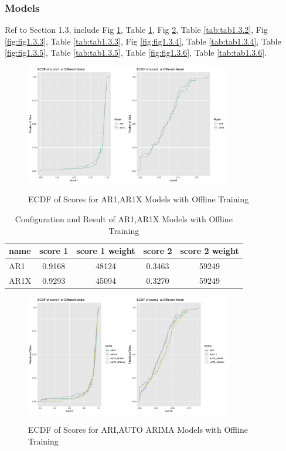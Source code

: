 \documentclass{article}
\begin{document}
\subsubsection{Models}
Ref to Section 1.3, include Fig \ref{fig:fig1.3.1}, Table \ref{tab:tab1.3.1}, Fig \ref{fig:fig1.3.2}, Table \ref{tab:tab1.3.2}, Fig \ref{fig:fig1.3.3}, Table \ref{tab:tab1.3.3}, Fig \ref{fig:fig1.3.4}, Table \ref{tab:tab1.3.4}, Table \ref{fig:fig1.3.5}, Table \ref{tab:tab1.3.5}, Table \ref{fig:fig1.3.6}, Table \ref{tab:tab1.3.6}.

\begin{figure}[htbp]
\caption{ECDF of Scores for AR1,AR1X Models with Offline Training}
\centering
\includegraphics[width = 0.8\textwidth]{images/ECDFofscoresatDifferentModelOfAR1, AR1X.png}
\label{fig:fig1.3.1}

\end{figure}

\begin{table}[htbp]
  \begin{center}
    \caption{Configuration and Result of AR1,AR1X Models with Offline Training}
    \label{tab:tab1.3.1}
    \begin{tabular}{l|*{4}{c}}
      \textbf{name} & \textbf{score 1} & \textbf{score 1 weight} & \textbf{score 2} & \textbf{score 2 weight} \\
      \hline
      AR1 & 0.9168 & 48124 & 0.3463 & 59249\\
      AR1X & 0.9293 & 45094 & 0.3270 & 59249\\
    \end{tabular}
  \end{center}
\end{table}

\begin{figure}[htbp]
\caption{ECDF of Scores for ARI,AUTO ARIMA Models with Offline Training}
\centering
\includegraphics[width = 0.8\textwidth]{images/ECDFofscoresatDifferentModelOfARI11, ARI11X, AUTOARIMA, AUTOARIMAX.png}
\label{fig:fig1.3.2}
\end{figure}
\end{document}
